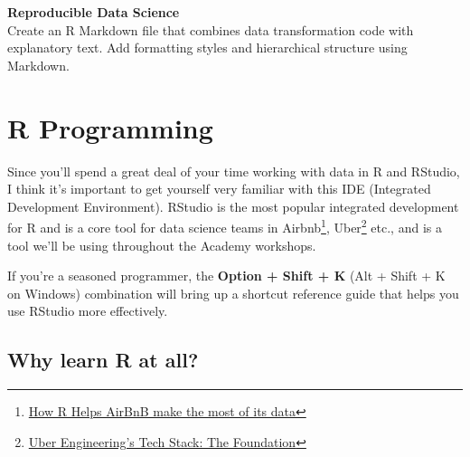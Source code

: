\documentclass[]{article}
\begin{document}
\textbf{Reproducible Data Science}\\
Create an R Markdown file that combines data transformation code with
explanatory text. Add formatting styles and hierarchical structure using
Markdown.

\hypertarget{r-programming}{%
\section{R Programming}\label{r-programming}}

Since you'll spend a great deal of your time working with data in R and
RStudio, I think it's important to get yourself very familiar with this
IDE (Integrated Development Environment). RStudio is the most popular
integrated development for R and is a core tool for data science teams
in Airbnb\footnote{\href{https://peerj.com/preprints/3182.pdf}{How R
  Helps AirBnB make the most of its data}}, Uber\footnote{\href{https://eng.uber.com/tech-stack-part-one/}{Uber
  Engineering's Tech Stack: The Foundation}} etc., and is a tool we'll
be using throughout the Academy workshops.

If you're a seasoned programmer, the \textbf{Option + Shift + K} (Alt +
Shift + K on Windows) combination will bring up a shortcut reference
guide that helps you use RStudio more effectively.

\hypertarget{why-learn-r-at-all}{%
\subsection{Why learn R at all?}\label{why-learn-r-at-all}}
\end{document}
